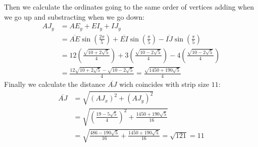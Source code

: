 \documentclass[11pt]{article}
\begin{document}
Then we calculate the ordinates going to the same order of vertices adding when we go up and substracting when we go down:
\begin{align}
AJ_y &= AE_y + EI_y + IJ_y\\
 &= \overline{AE}\sin\left(\frac{2\pi}5\right)
 + \overline{EI}\sin\left(\frac{\pi}5\right) 
 - \overline{IJ}\sin\left(\frac{\pi}5\right)\nonumber\\
 &= 12\left(\frac{\sqrt{10+2\sqrt5}}4\right)
 + 3\left(\frac{\sqrt{10-2\sqrt5}}4\right)
 - 4\left(\frac{\sqrt{10-2\sqrt5}}4\right)\nonumber\\
 &= \frac{12\sqrt{10+2\sqrt5} - \sqrt{10-2\sqrt5}}4 = \frac{\sqrt{1450+190\sqrt5}}4
\end{align}
Finally we calculate the distance $\overline{AJ}$ wich coincides with strip size $11$:
\begin{align}
\overline{AJ} &= \sqrt{(AJ_x)^2 + (AJ_y)^2}\\
 &= \sqrt{\left(\frac{19-5\sqrt5}4\right)^2 + \frac{1450+190\sqrt5}{16}}\nonumber\\
 &= \sqrt{\frac{486-190\sqrt5}{16} + \frac{1450+190\sqrt5}{16}} = \sqrt{121} = 11
\end{align}
\end{document}
